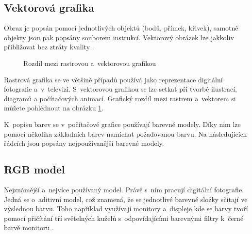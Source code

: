 \subsection*{Vektorová grafika}
Obraz je popsán pomocí jednotlivých objektů (bodů, přímek, křivek), samotné objekty jsou pak popsány souborem instrukcí. Vektorový obrázek lze jakkoliv přibližovat bez ztráty kvality \cite{rastr_vektr}.

\begin{figure}[h]
\begin{center}
\caption{Rozdíl mezi rastrovou a~vektorovou grafikou \cite{rastr_vektr_obr}}
\label{rastr_vektor_label}
\end{center}
\end{figure}

Rastrová grafika se ve většině případů používá jako reprezentace digitální fotografie a~v~televizi. S~vektorovou grafikou se lze setkat při tvorbě ilustrací, diagramů a počítačových animací. Grafický rozdíl mezi rastrem a~vektorem si můžete pohlédnout na obrázku \ref{rastr_vektor_label}.

K~popisu barev se v~počítačové grafice používají barevné modely. Díky nim lze pomocí několika základních barev namíchat požadovanou barvu. Na následujících řádcích jsou popsány nejpoužívanější barevné modely.

\subsection*{RGB model}
Nejznámější a~nejvíce používaný model. Právě s~ním pracují digitální fotografie. Jedná se o~aditivní model, což znamená, že se jednotlivé barevné složky sčítají ve výslednou barvu. Toho například využívají monitory a~displeje kde se barvy tvoří pomocí přičítání tří světelných kuželů s~odpovídajícími barevnými filtry k~černé barvě monitoru \cite{barvy}.

